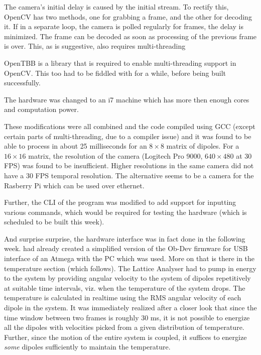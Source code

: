 		\par
		The camera's initial delay is caused by the initial stream. To rectify this, OpenCV has two methods, one for grabbing a frame, and the other for decoding it. If in a separate loop, the camera is polled regularly for frames, the delay is minimized. The frame can be decoded as soon as processing of the previous frame is over. This, as is suggestive, also requires multi-threading
		\par
		OpenTBB is a library that is required to enable multi-threading support in OpenCV. This too had to be fiddled with for a while, before being built successfully.
		\par
		The hardware was changed to an i7 machine which has more then enough cores and computation power.
		\par
		These modifications were all combined and the code compiled using GCC (except certain parts of multi-threading, due to a compiler issue) and it was found to be able to process in about 25 milliseconds for an $8 \times 8$ matrix of dipoles. For a $16 \times 16$ matrix, the resolution of the camera (Logitech Pro 9000, $640 \times 480$ at 30 FPS) was found to be insufficient. Higher resolutions in the same camera did not have a 30 FPS temporal resolution. The alternative seems to be a camera for the Rasberry Pi which can be used over ethernet.
		\par
		Further, the CLI of the program was modified to add support for inputting various commands, which would be required for testing the hardware (which is scheduled to be built this week).
		\par
		And surprise surprise, the hardware interface was in fact done in the following week. \myProf had already created a simplified version of the Ob-Dev firmware for USB interface of an Atmega with the PC which was used. More on that is there in the temperature section (which follows). The Lattice Analyser had to pump in energy to the system by providing angular velocity to the system of dipoles repetitively at suitable time intervals, viz. when the temperature of the system drops. The temperature is calculated in realtime using the RMS angular velocity of each dipole in the system. It was immediately realized after a closer look that since the time window between two frames is roughly 30 ms, it is not possible to energize all the dipoles with velocities picked from a given distribution of temperature. Further, since the motion of the entire system is coupled, it suffices to energize \emph{some} dipoles sufficiently to maintain the temperature.
